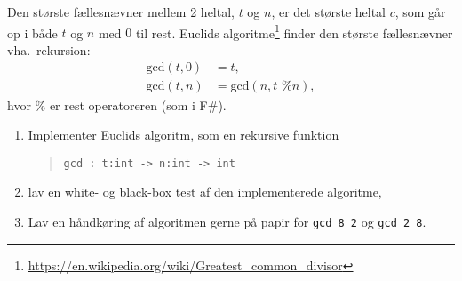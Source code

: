 \label{gcd} Den største fællesnævner mellem 2 heltal, $t$ og $n$, er det største heltal $c$, som går op i både $t$ og $n$ med $0$ til rest. Euclids algoritme\footnote{\url{https://en.wikipedia.org/wiki/Greatest_common_divisor}} finder den største fællesnævner vha.\ rekursion:
  \begin{align}
    \text{gcd}(t,0) &= t, \label{gcd:1}
    \\ \text{gcd}(t,n) &= \text{gcd}(n, t \text{ \% } n), \label{gcd:2}
  \end{align}
hvor $\%$ er rest operatoreren (som i F\#). 
\begin{enumerate}
\item Implementer Euclids algoritm, som en rekursive funktion
  \begin{quote}
    \lstinline{gcd : t:int -> n:int -> int}
  \end{quote}
\item lav en white- og black-box test af den implementerede algoritme,
\item Lav en håndkøring af algoritmen gerne på papir for \lstinline{gcd 8 2} og \lstinline{gcd 2 8}.
\end{enumerate}
